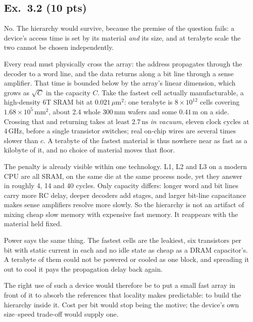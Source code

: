 \subsection*{Ex.~3.2 (10 pts)}

No. The hierarchy would survive, because the premise of the question fails: a
device's access time is set by its material \emph{and} its size, and at terabyte
scale the two cannot be chosen independently.

Every read must physically cross the array: the address propagates through the
decoder to a word line, and the data returns along a bit line through a sense
amplifier. That time is bounded below by the array's linear dimension, which grows
as $\sqrt{C}$ in the capacity $C$. Take the fastest cell actually manufacturable, a
high-density 6T SRAM bit at $0.021\,\mu\mathrm{m}^2$: one terabyte is
$8\times10^{12}$ cells covering $1.68\times10^{5}\,\mathrm{mm}^2$, about 2.4 whole
300\,mm wafers and some $0.41\,\mathrm{m}$ on a side. Crossing that and returning
takes at least $2.7\,\mathrm{ns}$ \emph{in vacuum}, eleven clock cycles at
4\,GHz, before a single transistor switches; real on-chip wires are several times
slower than $c$. A terabyte of the fastest material is thus nowhere near as fast as
a kilobyte of it, and no choice of material moves that floor.

The penalty is already visible within one technology. L1, L2 and L3 on a modern CPU
are all SRAM, on the same die at the same process node, yet they answer in roughly
4, 14 and 40 cycles. Only capacity differs: longer word and bit lines carry more RC
delay, deeper decoders add stages, and larger bit-line capacitance makes sense
amplifiers resolve more slowly. So the hierarchy is not an artifact of mixing cheap
slow memory with expensive fast memory. It reappears with the material held fixed.

Power says the same thing. The fastest cells are the leakiest, six transistors per
bit with static current in each and no idle state as cheap as a DRAM capacitor's. A
terabyte of them could not be powered or cooled as one block, and spreading it out
to cool it pays the propagation delay back again.

The right use of such a device would therefore be to put a small fast array in front
of it to absorb the references that locality makes predictable: to build the
hierarchy inside it. Cost per bit would stop being the motive; the device's own
size--speed trade-off would supply one.
